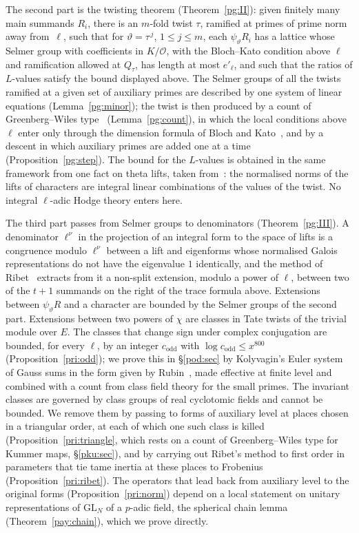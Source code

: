 \documentclass[10pt]{amsart}
\theoremstyle{definition}
\theoremstyle{remark}
\begin{document}
The second part is the twisting theorem (Theorem~\ref{pg:II}): given finitely many main summands
$R_i$, there is an $m$-fold twist $\tau$, ramified at primes of prime norm away from~$\ell$, such
that for $\vartheta=\tau^{\,j}$, $1\le j\le m$, each $\psi_\vartheta R_i$ has a lattice whose
Selmer group with coefficients in $K/\mathcal O$, with the Bloch--Kato condition above $\ell$
and ramification allowed at $Q_\tau$, has length at most $e'_\ell$, and such that the ratios of
$L$-values satisfy the bound displayed above. The Selmer groups of all the twists ramified at a
given set of auxiliary primes are described by one system of linear equations
(Lemma~\ref{pg:minor}); the twist is then produced by a count of Greenberg--Wiles
type~\cite{WilesFLT} (Lemma~\ref{pg:count}), in which the local conditions above $\ell$ enter
only through the dimension formula of Bloch and Kato~\cite{BlochKato}, and by a descent in which
auxiliary primes are added one at a time (Proposition~\ref{pg:step}). The bound for the $L$-values is obtained in the same framework from one fact on
theta lifts, taken from~\cite{P54}: the normalised norms of the lifts of characters are integral
linear combinations of the values of the twist. No integral $\ell$-adic Hodge theory enters
here.

The third part passes from Selmer groups to denominators (Theorem~\ref{pg:III}). A denominator
$\ell^\nu$ in the projection of an integral form to the space of lifts is a congruence modulo
$\ell^\nu$ between a lift and eigenforms whose normalised Galois representations do not have the
eigenvalue $1$ identically, and the method of Ribet~\cite{Ribet1976} extracts from it a non-split
extension, modulo a power of $\ell$, between two of the $t+1$ summands on the right of the trace
formula above. Extensions between $\psi_\vartheta R$ and a character are bounded by the Selmer
groups of the second part. Extensions between two powers of $\chi$ are classes in Tate twists
of the trivial module over $E$. The classes that change sign under complex conjugation are bounded,
for every $\ell$, by an integer $c_{\mathrm{odd}}$ with $\log c_{\mathrm{odd}}\le x^{800}$
(Proposition~\ref{pri:odd}); we prove this in \S\ref{pod:sec} by Kolyvagin's Euler system
of Gauss sums in the form given by Rubin~\cite{RubinTexel}, made effective at finite level and
combined with a count from class field theory for the small primes. The
invariant classes are governed by class groups of real cyclotomic fields and cannot be bounded.
We remove them by passing to forms of auxiliary level at places chosen in a triangular order, at
each of which one such class is killed (Proposition~\ref{pri:triangle}, which rests on a count
of Greenberg--Wiles type for Kummer maps, \S\ref{pku:sec}), and by carrying out Ribet's
method to first order in parameters that tie tame inertia at these places to Frobenius
(Proposition~\ref{pri:ribet}). The operators that lead back from auxiliary level to the original forms
(Proposition~\ref{pri:norm}) depend on a local statement on unitary representations of $\mathrm{GL}_N$ of a $p$-adic field, the spherical
chain lemma (Theorem~\ref{pay:chain}), which we prove directly.
\end{document}
